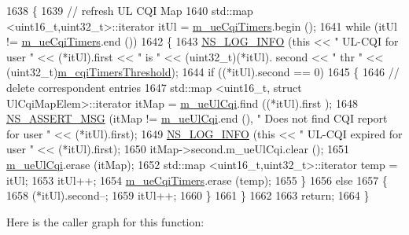 \begin{DoxyCode}
1638 \{
1639   \textcolor{comment}{// refresh UL CQI  Map}
1640   std::map <uint16\_t,uint32\_t>::iterator itUl = \hyperlink{classns3_1_1MmWaveFlexTtiMacScheduler_a21afc99c752ed7b331690dc9a479c3f0}{m\_ueCqiTimers}.begin ();
1641   \textcolor{keywordflow}{while} (itUl != \hyperlink{classns3_1_1MmWaveFlexTtiMacScheduler_a21afc99c752ed7b331690dc9a479c3f0}{m\_ueCqiTimers}.end ())
1642     \{
1643       \hyperlink{group__logging_gafbd73ee2cf9f26b319f49086d8e860fb}{NS\_LOG\_INFO} (\textcolor{keyword}{this} << \textcolor{stringliteral}{" UL-CQI for user "} << (*itUl).first << \textcolor{stringliteral}{" is "} << (uint32\_t)(*itUl).
      second << \textcolor{stringliteral}{" thr "} << (uint32\_t)\hyperlink{classns3_1_1MmWaveFlexTtiMacScheduler_ab79b59a03053301ed05f22fdb701a7ef}{m\_cqiTimersThreshold});
1644       \textcolor{keywordflow}{if} ((*itUl).second == 0)
1645         \{
1646           \textcolor{comment}{// delete correspondent entries}
1647           std::map <uint16\_t, struct UlCqiMapElem>::iterator itMap = \hyperlink{classns3_1_1MmWaveFlexTtiMacScheduler_a1b7ed5c8fa4442252efa7cc43318f463}{m\_ueUlCqi}.find ((*itUl).first
      );
1648           \hyperlink{assert_8h_aff5ece9066c74e681e74999856f08539}{NS\_ASSERT\_MSG} (itMap != \hyperlink{classns3_1_1MmWaveFlexTtiMacScheduler_a1b7ed5c8fa4442252efa7cc43318f463}{m\_ueUlCqi}.end (), \textcolor{stringliteral}{" Does not find CQI report for
       user "} << (*itUl).first);
1649           \hyperlink{group__logging_gafbd73ee2cf9f26b319f49086d8e860fb}{NS\_LOG\_INFO} (\textcolor{keyword}{this} << \textcolor{stringliteral}{" UL-CQI expired for user "} << (*itUl).first);
1650           itMap->second.m\_ueUlCqi.clear ();
1651           \hyperlink{classns3_1_1MmWaveFlexTtiMacScheduler_a1b7ed5c8fa4442252efa7cc43318f463}{m\_ueUlCqi}.erase (itMap);
1652           std::map <uint16\_t,uint32\_t>::iterator temp = itUl;
1653           itUl++;
1654           \hyperlink{classns3_1_1MmWaveFlexTtiMacScheduler_a21afc99c752ed7b331690dc9a479c3f0}{m\_ueCqiTimers}.erase (temp);
1655         \}
1656       \textcolor{keywordflow}{else}
1657         \{
1658           (*itUl).second--;
1659           itUl++;
1660         \}
1661     \}
1662 
1663   \textcolor{keywordflow}{return};
1664 \}
\end{DoxyCode}


Here is the caller graph for this function\+:


